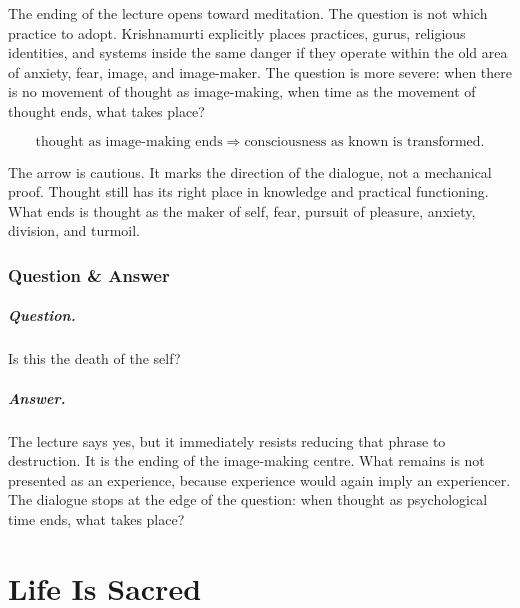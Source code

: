 \documentclass[11pt,oneside]{book}
\begin{document}
The ending of the lecture opens toward meditation. The question is not which practice to adopt. Krishnamurti explicitly places practices, gurus, religious identities, and systems inside the same danger if they operate within the old area of anxiety, fear, image, and image-maker. The question is more severe: when there is no movement of thought as image-making, when time as the movement of thought ends, what takes place?

\begin{equation}
\text{thought as image-making ends}
\Longrightarrow
\text{consciousness as known is transformed}.
\end{equation}

The arrow is cautious. It marks the direction of the dialogue, not a mechanical proof. Thought still has its right place in knowledge and practical functioning. What ends is thought as the maker of self, fear, pursuit of pleasure, anxiety, division, and turmoil.

\subsection{Question \& Answer}

\paragraph{Question.}
Is this the death of the self?

\paragraph{Answer.}
The lecture says yes, but it immediately resists reducing that phrase to destruction. It is the ending of the image-making centre. What remains is not presented as an experience, because experience would again imply an experiencer. The dialogue stops at the edge of the question: when thought as psychological time ends, what takes place?


\chapter{Life Is Sacred}
\end{document}
